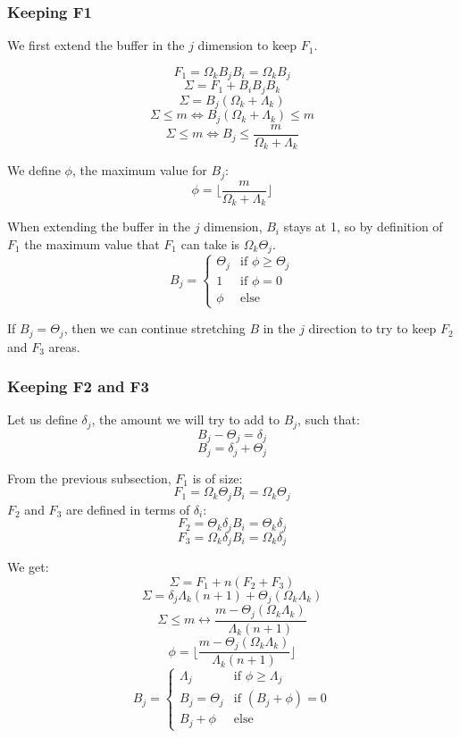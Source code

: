 \documentclass[conference]{IEEEtran}
\begin{document}
\subsubsection{Keeping F1}

We first extend the buffer in the $j$ dimension to keep $F_1$.

\noindent $$F_1 = \Omega_k B_j B_i = \Omega_k B_j$$
$$\Sigma = F_1 + B_iB_jB_k$$
$$\Sigma = B_j (\Omega_k + \Lambda_k)$$
$$\Sigma \leq m \Leftrightarrow B_j (\Omega_k + \Lambda_k) \leq m$$
$$\Sigma \leq m \Leftrightarrow B_j \leq \frac{m}{\Omega_k + \Lambda_k}$$

We define $\phi$, the maximum value for $B_j$:
$$\phi = \lfloor \frac{m}{\Omega_k + \Lambda_k} \rfloor$$

When extending the buffer in the $j$ dimension, $B_i$ stays at 1, so by
definition of $F_1$ the maximum value that $F_1$ can take is $\Omega_k\Theta_j$.
$$B_j = \begin{cases}
  \Theta_j & \textrm{if }\phi \geq \Theta_j \\
  1 & \textrm{if }\phi = 0 \\
  \phi & \textrm{else}
\end{cases}$$

If $B_j=\Theta_j$, then we can continue stretching $B$ in the $j$ direction to
try to keep $F_2$ and $F_3$ areas.

\subsubsection{Keeping F2 and F3}

Let us define $\delta_j$, the amount we will try to add to $B_j$, such that:
$$B_j - \Theta_j = \delta_j$$
$$B_j = \delta_j + \Theta_j$$

From the previous subsection, $F_1$ is of size:
$$F_1 = \Omega_k \Theta_j B_i = \Omega_k \Theta_j$$
$F_2$ and $F_3$ are defined in terms of $\delta_i$:
$$F_2 = \Theta_k \delta_j B_i = \Theta_k \delta_j$$
$$F_3 = \Omega_k \delta_j B_i = \Omega_k \delta_j$$

We get:
$$\Sigma = F_1 + n(F_2+F_3)$$
$$\Sigma = \delta_j\Lambda_k(n+1) + \Theta_j(\Omega_k\Lambda_k)$$
$$\Sigma \leq m \leftrightarrow \frac{m-\Theta_j(\Omega_k\Lambda_k)}{\Lambda_k(n+1)}$$
$$\phi = \lfloor \frac{m-\Theta_j(\Omega_k\Lambda_k)}{\Lambda_k(n+1)} \rfloor$$
$$B_j = \begin{cases}
  \Lambda_j & \textrm{if }\phi \geq \Lambda_j \\
  B_j = \Theta_j & \textrm{if }(B_j+\phi) = 0 \\
  B_j + \phi & \textrm{else}
\end{cases}$$
\end{document}
